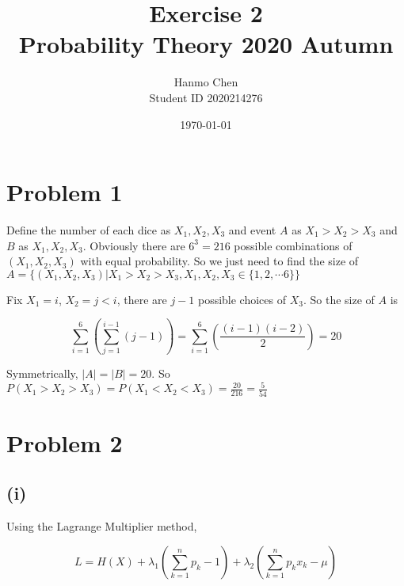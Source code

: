 \documentclass{article}
\title{Exercise 2 \\ Probability Theory 2020 Autumn}
\author{Hanmo Chen \\ Student ID 2020214276}
\date{\today}
\begin{document}
\maketitle
\tableofcontents
\newpage
\section{Problem 1}

Define the number of each dice as $X_1,X_2,X_3$ and event $A$ as $X_1>X_2>X_3$ and $B$ as $X_1,X_2,X_3$. Obviously there are $6^3 = 216$ possible combinations of $(X_1,X_2,X_3)$ with equal probability. So we just need to find the size of $A = \{(X_1,X_2,X_3)|X_1>X_2>X_3,X_1,X_2,X_3 \in \{1,2,\cdots 6\}\}$

Fix $X_1 = i$, $X_2 = j <i$, there are $j-1$ possible choices of $X_3$. So the size of $A$ is 

\begin{equation}
    \sum_{i=1}^6 \left(\sum_{j=1}^{i-1} (j-1)\right) = \sum_{i=1}^6 \left(\frac{(i-1)(i-2)}{2}\right) = 20
\end{equation}

Symmetrically, $|A| = |B| = 20$. So $P(X_1 >X_2>X_3)   = P(X_1 < X_2<X_3) = \frac{20}{216} = \frac{5}{54}$


\section{Problem 2}

\subsection{(i)}



Using the Lagrange Multiplier method, 

\begin{equation}
    L = H(X) + \lambda_1(\sum_{k=1}^n p_k - 1) + \lambda_2 (\sum_{k=1}^n p_kx_k - \mu)
\end{equation}
\end{document}
